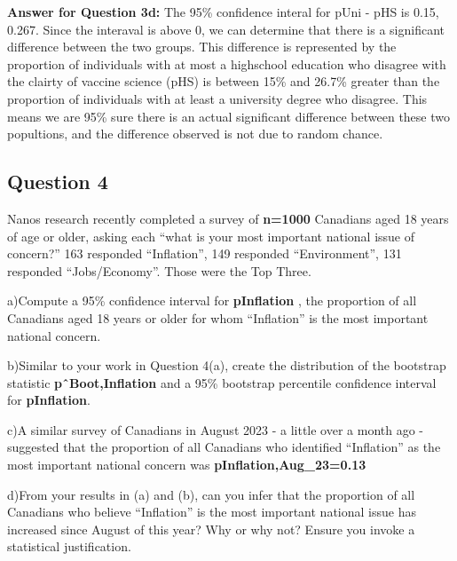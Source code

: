 \documentclass[
]{article}
\begin{document}
\textbf{Answer for Question 3d:} The 95\% confidence interal for pUni -
pHS is 0.15, 0.267. Since the interaval is above 0, we can determine
that there is a significant difference between the two groups. This
difference is represented by the proportion of individuals with at most
a highschool education who disagree with the clairty of vaccine science
(pHS) is between 15\% and 26.7\% greater than the proportion of
individuals with at least a university degree who disagree. This means
we are 95\% sure there is an actual significant difference between these
two popultions, and the difference observed is not due to random chance.

\hypertarget{question-4}{%
\subsection{Question 4}\label{question-4}}

Nanos research recently completed a survey of \textbf{n=1000} Canadians
aged 18 years of age or older, asking each ``what is your most important
national issue of concern?'' 163 responded ``Inflation'', 149 responded
``Environment'', 131 responded ``Jobs/Economy''. Those were the Top
Three.

a)Compute a 95\% confidence interval for \textbf{pInflation} , the
proportion of all Canadians aged 18 years or older for whom
``Inflation'' is the most important national concern.

b)Similar to your work in Question 4(a), create the distribution of the
bootstrap statistic \textbf{pˆBoot,Inflation} and a 95\% bootstrap
percentile confidence interval for \textbf{pInflation}.

c)A similar survey of Canadians in August 2023 - a little over a month
ago - suggested that the proportion of all Canadians who identified
``Inflation'' as the most important national concern was
\textbf{pInflation,Aug\_23=0.13}

d)From your results in (a) and (b), can you infer that the proportion of
all Canadians who believe ``Inflation'' is the most important national
issue has increased since August of this year? Why or why not? Ensure
you invoke a statistical justification.
\end{document}
